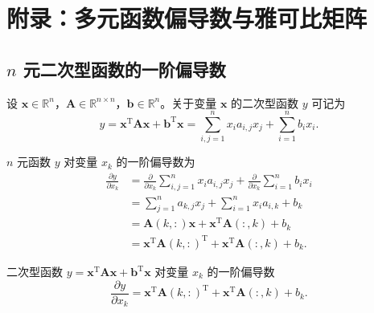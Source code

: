
\section*{附录：多元函数偏导数与雅可比矩阵}

\subsection{$n$ 元二次型函数的一阶偏导数}

设 $\boldsymbol{x} \in \mathbb{R}^n$，$\boldsymbol{A} \in \mathbb{R}^{n \times n}$，$\boldsymbol{b} \in \mathbb{R}^n$。关于变量 $\boldsymbol{x}$ 的二次型函数 $y$ 可记为
\begin{equation*}
y = \boldsymbol{x}^{\mathrm{T}} \boldsymbol{A} \boldsymbol{x} + \boldsymbol{b}^{\mathrm{T}} \boldsymbol{x} = \sum_{i,j=1}^{n} x_i a_{i,j} x_j + \sum_{i=1}^{n} b_i x_i.
\end{equation*}

$n$ 元函数 $y$ 对变量 $x_k$ 的一阶偏导数为
\begin{equation*}
\begin{aligned}
\frac{\partial y}{\partial x_k}
&= \frac{\partial}{\partial x_k} \sum_{i,j=1}^{n} x_i a_{i,j} x_j + \frac{\partial}{\partial x_k} \sum_{i=1}^{n} b_i x_i \\
&= \sum_{j=1}^{n} a_{k,j} x_j + \sum_{i=1}^{n} x_i a_{i,k} + b_k \\
&= \boldsymbol{A}(k,:) \boldsymbol{x} + \boldsymbol{x}^{\mathrm{T}} \boldsymbol{A}(:,k) + b_k \\
&= \boldsymbol{x}^{\mathrm{T}} \boldsymbol{A}(k,:)^{\mathrm{T}} + \boldsymbol{x}^{\mathrm{T}} \boldsymbol{A}(:,k) + b_k.
\end{aligned}
\end{equation*}

二次型函数 $y = \boldsymbol{x}^{\mathrm{T}} \boldsymbol{A} \boldsymbol{x} + \boldsymbol{b}^{\mathrm{T}} \boldsymbol{x}$ 对变量 $x_k$ 的一阶偏导数
\begin{equation*}
\frac{\partial y}{\partial x_k} = \boldsymbol{x}^{\mathrm{T}} \boldsymbol{A}(k,:)^{\mathrm{T}} + \boldsymbol{x}^{\mathrm{T}} \boldsymbol{A}(:,k) + b_k.
\end{equation*}


